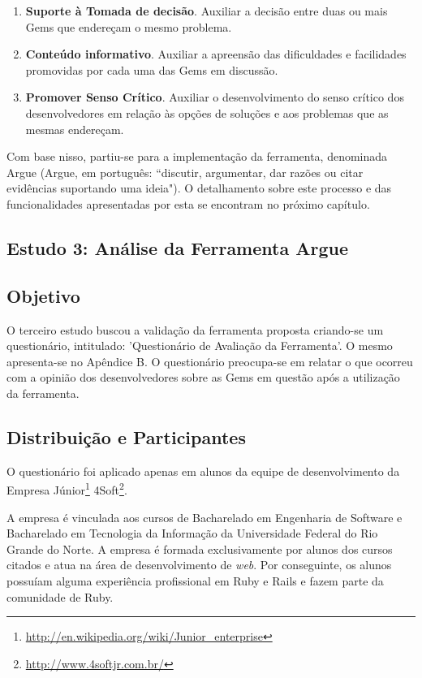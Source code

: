 \begin{enumerate}

  \item \textbf{Suporte à Tomada de decisão}. Auxiliar a decisão entre duas ou mais Gems que endereçam o mesmo problema.
  
  \item \textbf{Conteúdo informativo}. Auxiliar a apreensão das dificuldades e facilidades promovidas por cada uma das Gems em discussão.
  
  \item \textbf{Promover Senso Crítico}. Auxiliar o desenvolvimento do senso crítico dos desenvolvedores em relação às opções de soluções e aos problemas que as mesmas endereçam.
  
\end{enumerate}

Com base nisso, partiu-se para a implementação da ferramenta, denominada Argue
(Argue, em português: “discutir, argumentar, dar razões ou citar evidências suportando uma ideia"). O
detalhamento sobre este processo e das funcionalidades apresentadas por esta se encontram
no próximo capítulo.

\subsection{Estudo 3: Análise da Ferramenta Argue}

\subsection{Objetivo}

O terceiro estudo buscou a validação da ferramenta proposta criando-se um questionário, intitulado: 'Questionário de Avaliação da Ferramenta'. O mesmo apresenta-se no Apêndice B. O questionário preocupa-se em relatar o que ocorreu com a opinião dos desenvolvedores sobre as Gems em questão após a utilização da ferramenta.

\subsection{Distribuição e Participantes}

O questionário foi aplicado apenas em alunos da equipe de desenvolvimento da Empresa Júnior\footnote{\url{http://en.wikipedia.org/wiki/Junior_enterprise}} 4Soft\footnote{\url{http://www.4softjr.com.br/}}. 

A empresa é vinculada aos cursos de Bacharelado em Engenharia de Software e Bacharelado em Tecnologia da Informação da Universidade Federal do Rio Grande do Norte. A empresa é formada exclusivamente por alunos dos cursos citados e atua na área de desenvolvimento de \textit{web}. Por conseguinte, os alunos possuíam alguma experiência profissional em Ruby e Rails e fazem parte da comunidade de Ruby. 

